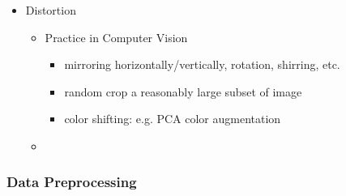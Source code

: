 \begin{itemize}
\item Distortion
	\begin{itemize}
	\item Practice in Computer Vision
		\begin{itemize}
		\item mirroring horizontally/vertically, rotation, shirring, etc.
		\item random crop a reasonably large subset of image
		\item color shifting: e.g. PCA color augmentation
		\end{itemize}
	\item 
	\end{itemize}
\end{itemize}
\subsubsection{Data Preprocessing}
